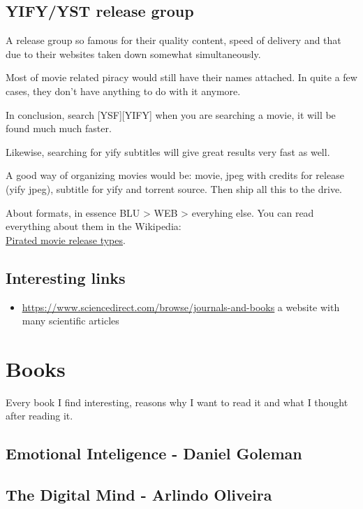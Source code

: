 \subsection{YIFY/YST release group}
A release group so famous for their quality content, speed of delivery and that due to their websites taken down somewhat simultaneously. 

Most of movie related piracy would still have their names attached. In quite a few cases, they don't have anything to do with it anymore. 

In conclusion, search [YSF][YIFY] when you are searching a movie, it will be found much much faster.

Likewise, searching for yify subtitles will give great results very fast as well.

A good way of organizing movies would be: movie, jpeg with credits for release (yify jpeg), subtitle for yify and torrent source. Then ship all this to the drive.

About formats, in essence BLU > WEB > everyhing else. You can read everything about them in the Wikipedia:\\ \href{https://en.wikipedia.org/wiki/Pirated_movie_release_types}{\uline{Pirated movie release types}}.



\subsection{Interesting links}

\begin{itemize}
    \item \href{https://www.sciencedirect.com/browse/journals-and-books}{\ul{https://www.sciencedirect.com/browse/journals-and-books}} a website with many scientific articles
\end{itemize}


\section{Books}
\par Every book I find interesting, reasons why I want to read it and what I thought after reading it.

\subsection{Emotional Inteligence - Daniel Goleman}

\subsection{The Digital Mind - Arlindo Oliveira}

